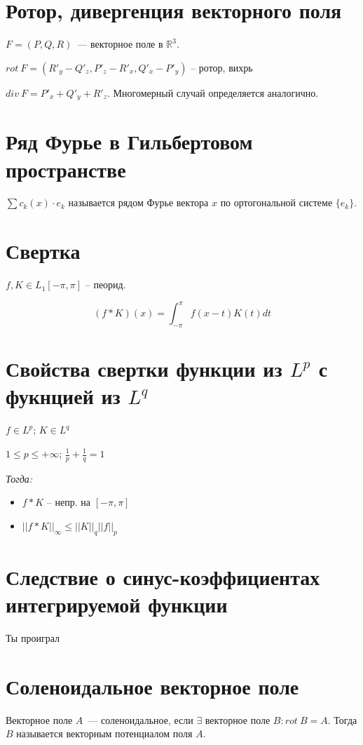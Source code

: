 \documentclass[paper=a4, fontsize=14pt]{article}
\begin{document}
\section{Ротор, дивергенция векторного поля}
$F = (P, Q, R)$~--- векторное поле в $\mathds{R}^3$.

$ rot\ F = (R'_y - Q'_z, P'_z - R'_x, Q'_x - P'_y) $ -- ротор, вихрь

$div\ F = P'_x + Q'_y + R'_z$. Многомерный случай определяется аналогично.

\section{Ряд Фурье в Гильбертовом пространстве}

$\sum c_k(x) \cdot e_k$ называется рядом Фурье вектора $x$ по ортогональной системе $\{e_k\}$.

\section{Свертка}

$ f, K \in L_1[-\pi, \pi]$  -- пеорид.

$$ (f \ast K)(x) = \int_{-\pi}^{\pi} f(x-t)K(t) dt$$

\section{Свойства свертки функции из $ L^p $ с фукнцией из $ L^q $}

$ f \in L^p $; $ K \in L^q $

$ 1 \leqslant p \leqslant +\infty $; $ \frac{1}{p} + \frac{1}{q} = 1 $

\emph{Тогда:}
\begin{itemize}
\item $ f \ast K $ -- непр. на $ [-\pi, \pi] $
\item $ ||f \ast K||_{\infty} \leqslant ||K||_q ||f||_p $
\end{itemize}

\section{Следствие о синус-коэффициентах интегрируемой функции}
Ты проиграл

\section{Соленоидальное векторное поле}
Векторное поле $A$~--- соленоидальное, если $\exists$ векторное поле $B: rot\ B = A$. Тогда $B$ называется векторным потенциалом поля $A$.
\end{document}
